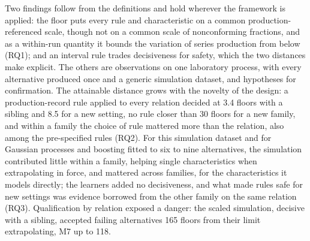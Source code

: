 \documentclass[pdflatex,sn-basic,lineno]{sn-jnl}
\begin{document}
Two findings follow from the definitions and hold wherever the framework is applied: the floor puts every rule and characteristic on a common production-referenced scale, though not on a common scale of nonconforming fractions, and as a within-run quantity it bounds the variation of series production from below (RQ1); and an interval rule trades decisiveness for safety, which the two distances make explicit. The others are observations on one laboratory process, with every alternative produced once and a generic simulation dataset, and hypotheses for confirmation. The attainable distance grows with the novelty of the design: a production-record rule applied to every relation decided at 3.4 floors with a sibling and 8.5 for a new setting, no rule closer than 30 floors for a new family, and within a family the choice of rule mattered more than the relation, also among the pre-specified rules (RQ2). For this simulation dataset and for Gaussian processes and boosting fitted to six to nine alternatives, the simulation contributed little within a family, helping single characteristics when extrapolating in force, and mattered across families, for the characteristics it models directly; the learners added no decisiveness, and what made rules safe for new settings was evidence borrowed from the other family on the same relation (RQ3). Qualification by relation exposed a danger: the scaled simulation, decisive with a sibling, accepted failing alternatives 165 floors from their limit extrapolating, M7 up to 118.
\end{document}
